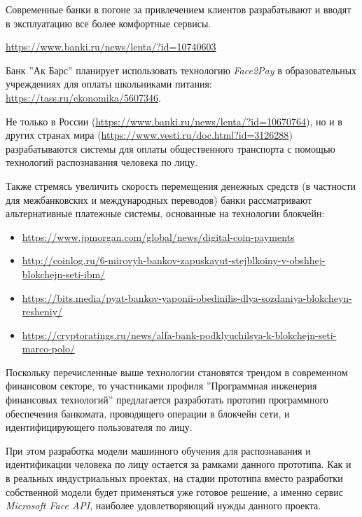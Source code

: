 Современные банки в погоне за привлечением клиентов разрабатывают и вводят в
эксплуатацию все более комфортные сервисы. 

{\url{https://www.banki.ru/news/lenta/?id=10740603}}

Банк ''Ак Барс'' планирует использовать технологию \textit{Face2Pay} в
образовательных учреждениях для оплаты школьниками питания:
\url{https://tass.ru/ekonomika/5607346}.

Не только в России (\url{https://www.banki.ru/news/lenta/?id=10670764}), но и в других
странах мира (\url{https://www.vesti.ru/doc.html?id=3126288}) разрабатываются системы
для оплаты общественного транспорта с помощью технологий распознавания человека по лицу.

Также стремясь увеличить скорость перемещения денежных средств (в частности для
межбанковских и международных переводов) банки рассматривают альтернативные платежные
системы, основанные на технологии блокчейн:
\begin{itemize}
  \item \url{https://www.jpmorgan.com/global/news/digital-coin-payments}
  \item \url{http://coinlog.ru/6-mirovyh-bankov-zapuskayut-stejblkoiny-v-obshhej-blokchejn-seti-ibm/}
  \item \url{https://bits.media/pyat-bankov-yaponii-obedinilis-dlya-sozdaniya-blokcheyn-resheniy/}
  \item \url{https://cryptoratings.ru/news/alfa-bank-podklyuchilsya-k-blokchejn-seti-marco-polo/}
\end{itemize}

Поскольку перечисленные выше технологии становятся трендом в современном финансовом
секторе, то участниками профиля ''Программная инженерия финансовых технологий''
предлагается разработать прототип программного обеспечения банкомата, проводящего операции
в блокчейн сети, и идентифицирующего пользователя по лицу.

При этом разработка модели машинного обучения для распознавания и идентификации человека по лицу
остается за рамками данного прототипа. Как и в реальных индустриальных проектах, на стадии
прототипа вместо разработки собственной модели будет применяться уже готовое решение, а именно
сервис \textit{Microsoft Face API}, наиболее удовлетворяющий нужды данного проекта.

